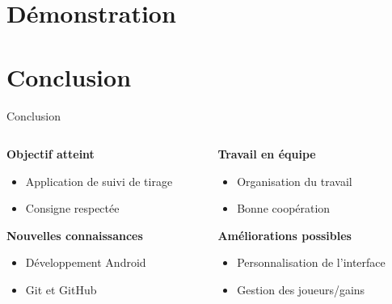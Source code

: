 \documentclass{beamer}
\begin{document}
\section{Démonstration}

\section{Conclusion}

\begin{frame}{Conclusion}
    \begin{columns}[T]
    \begin{column}[c]{6cm}
        \textbf{Objectif atteint}
        \begin{itemize}[label=]
            \item Application de suivi de tirage
            \item Consigne respectée
        \end{itemize}
        \vspace{3em}
        \textbf{Nouvelles connaissances}
        \begin{itemize}[label=]
            \item Développement Android
            \item Git et GitHub
        \end{itemize}
    \end{column}
    \begin{column}[c]{6cm}
        \textbf{Travail en équipe}
        \begin{itemize}[label=]
            \item Organisation du travail
            \item Bonne coopération
        \end{itemize}
        \vspace{3em}
        \textbf{Améliorations possibles}
        \begin{itemize}[label=]
            \item Personnalisation de l'interface
            \item Gestion des joueurs/gains
        \end{itemize}
    \end{column}
    \end{columns}
\end{frame}
\end{document}
